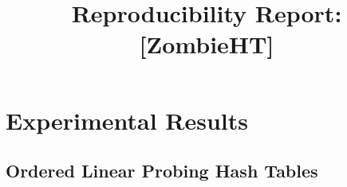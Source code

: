 \documentclass[11pt,a4paper]{article}
\title{\textbf{Reproducibility Report: \\[0.5em] \large [ZombieHT]}}
\begin{document}

\newcommand{\ZM}{\textbf{ZombieHT}}
\newcommand{\ZMV}{\textbf{ZombieHT(V)}}
\newcommand{\ZMC}{\textbf{ZombieHT(C)}}
\newcommand{\RHM}{\textbf{RobinHoodHT}}
\newcommand{\GRHM}{\textbf{GraveyardHT}}
\newcommand{\TM}{\textbf{TombstoneHT}}
\newcommand{\ABSL}{\textbf{AbslHT}}
\newcommand{\CLHT}{\textbf{CLHT}}
\newcommand{\ICE}{\textbf{IcebergHT}}
\newcommand{\CUCKOO}{\textbf{CuckooHT}}
\newcommand{\PTS}{C_p}



\section{Experimental Results}

\subsection{Ordered Linear Probing Hash Tables}
\end{document}

